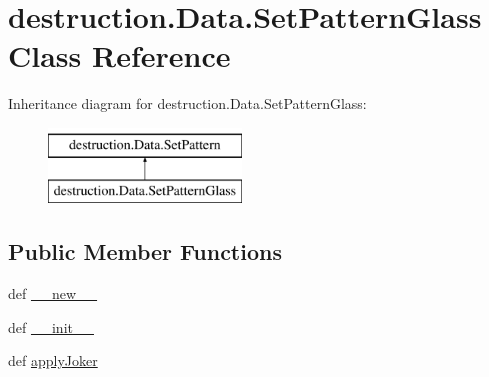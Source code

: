 \hypertarget{classdestruction_1_1_data_1_1_set_pattern_glass}{\section{destruction.\-Data.\-Set\-Pattern\-Glass Class Reference}
\label{classdestruction_1_1_data_1_1_set_pattern_glass}
}
Inheritance diagram for destruction.\-Data.\-Set\-Pattern\-Glass\-:\begin{figure}[H]
\begin{center}
\leavevmode
\includegraphics[height=2.000000cm]{classdestruction_1_1_data_1_1_set_pattern_glass}
\end{center}
\end{figure}
\subsection*{Public Member Functions}
\begin{DoxyCompactItemize}
\item 
def \hyperlink{classdestruction_1_1_data_1_1_set_pattern_glass_a74b5ac61a93a324fb04c8ebe723d7c20}{\-\_\-\-\_\-new\-\_\-\-\_\-}
\item 
def \hyperlink{classdestruction_1_1_data_1_1_set_pattern_glass_add7474f9caf4e8eb12349cdf8f4e6ddf}{\-\_\-\-\_\-init\-\_\-\-\_\-}
\item 
def \hyperlink{classdestruction_1_1_data_1_1_set_pattern_glass_a022bea5f39f012c19ce36e913931f25d}{apply\-Joker}
\end{DoxyCompactItemize}
